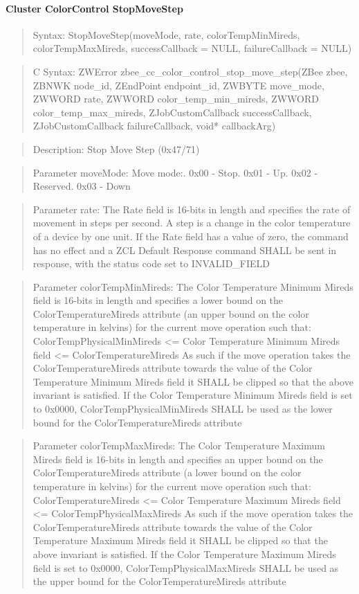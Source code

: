 \paragraph{Cluster ColorControl StopMoveStep}
\begin{quote}Syntax: StopMoveStep(moveMode, rate, colorTempMinMireds, colorTempMaxMireds, successCallback = NULL, failureCallback = NULL)\end{quote}
\begin{quote}C Syntax: ZWError zbee\_cc\_color\_control\_stop\_move\_step(ZBee zbee, ZBNWK node\_id, ZEndPoint endpoint\_id, ZWBYTE move\_mode, ZWWORD rate, ZWWORD color\_temp\_min\_mireds, ZWWORD color\_temp\_max\_mireds, ZJobCustomCallback successCallback, ZJobCustomCallback failureCallback, void* callbackArg)\end{quote}
\begin{quote}Description: Stop Move Step (0x47/71)\end{quote}
\begin{quote}Parameter moveMode: Move mode:. 0x00 - Stop. 0x01 - Up. 0x02 - Reserved. 0x03 - Down\end{quote}
\begin{quote}Parameter rate: The Rate field is 16-bits in length and specifies the rate of movement in steps per second. A step is a change in the color temperature of a device by one unit. If the Rate field has a value of zero, the command has no effect and a ZCL Default Response command SHALL be sent in response, with the status code set to INVALID\_FIELD\end{quote}
\begin{quote}Parameter colorTempMinMireds: The Color Temperature Minimum Mireds field is 16-bits in length and specifies a lower bound on the ColorTemperatureMireds attribute (an upper bound on the color temperature in kelvins) for the current move operation such that: ColorTempPhysicalMinMireds <= Color Temperature Minimum Mireds field <= ColorTemperatureMireds As such if the move operation takes the ColorTemperatureMireds attribute towards the value of the Color Temperature Minimum Mireds field it SHALL be clipped so that the above invariant is satisfied. If the Color Temperature Minimum Mireds field is set to 0x0000, ColorTempPhysicalMinMireds SHALL be used as the lower bound for the ColorTemperatureMireds attribute\end{quote}
\begin{quote}Parameter colorTempMaxMireds: The Color Temperature Maximum Mireds field is 16-bits in length and specifies an upper bound on the ColorTemperatureMireds attribute (a lower bound on the color temperature in kelvins) for the current move operation such that: ColorTemperatureMireds <= Color Temperature Maximum Mireds field <= ColorTempPhysicalMaxMireds As such if the move operation takes the ColorTemperatureMireds attribute towards the value of the Color Temperature Maximum Mireds field it SHALL be clipped so that the above invariant is satisfied. If the Color Temperature Maximum Mireds field is set to 0x0000, ColorTempPhysicalMaxMireds SHALL be used as the upper bound for the ColorTemperatureMireds attribute\end{quote}

